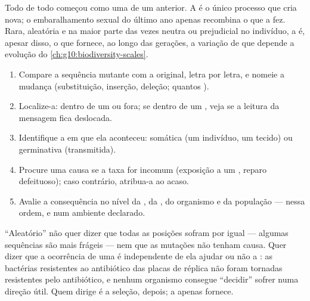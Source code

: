 \begin{proposition}\label{prop:g11:mutations:source}
Todo  de todo  começou como uma  de um  anterior.
A  é o único processo que cria  nova; o
embaralhamento sexual do último ano apenas recombina o que a 
fez. Rara, aleatória e na maior parte das vezes neutra ou prejudicial
no indivíduo, a  é, apesar disso, o que fornece, ao longo das
gerações, a variação de que depende a evolução do
\cref{ch:g10:biodiversity-scales}.
\end{proposition}
\admitted

\begin{method}\label{met:g11:mutations:analyse}
\begin{enumerate}
  \item Compare a sequência mutante com a original, letra por letra, e
        nomeie a mudança (substituição, inserção, deleção; quantos
        ).
  \item Localize-a: dentro de um  ou fora; se dentro de um ,
        veja se a leitura da mensagem fica deslocada.
  \item Identifique a  em que ela aconteceu: somática (um
        indivíduo, um tecido) ou germinativa (transmitida).
  \item Procure uma causa se a taxa for incomum (exposição a um
        , reparo defeituoso); caso contrário, atribua-a ao
        acaso.
  \item Avalie a consequência no nível da , da , do
        organismo e da população --- nessa ordem, e num ambiente
        declarado.
\end{enumerate}
\end{method}

\begin{remark}\label{rem:g11:mutations:random}
``Aleatório'' não quer dizer que todas as posições sofram  por
igual --- algumas sequências são mais frágeis --- nem que as mutações
não tenham causa. Quer dizer que a ocorrência de uma  é
independente de ela ajudar ou não a : as bactérias resistentes ao
antibiótico das placas de réplica não foram tornadas resistentes pelo
antibiótico, e nenhum organismo consegue ``decidir'' sofrer 
numa direção útil. Quem dirige é a seleção, depois; a  apenas
fornece.
\end{remark}

